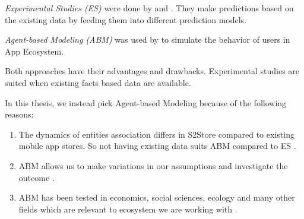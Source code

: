\emph{Experimental Studies (ES)} were done by \cite{pagano2013user} and \cite{chen2011predicting}. They make predictions based on the existing data by feeding them into different prediction models. 

\emph{Agent-based Modeling (ABM)} was used by \cite{lim2012successful} to simulate the behavior of users in App Ecosystem.

Both approaches have their advantages and drawbacks. Experimental studies are suited when existing facts based data are available.

In this thesis, we instead pick Agent-based Modeling because of the following reasons:

\begin{enumerate}
  \item The dynamics of entities association differs in S2Store compared to existing mobile app stores. So not having existing data suits ABM compared to ES \cite{castiglione2006agent}.
  \item ABM allows us to make variations in our assumptions and investigate the outcome \cite{castiglione2006agent}.
  \item ABM has been tested in economics, social sciences, ecology and many other fields which are relevant to ecosystem we are working with \cite{lim2012successful}.
\end{enumerate}